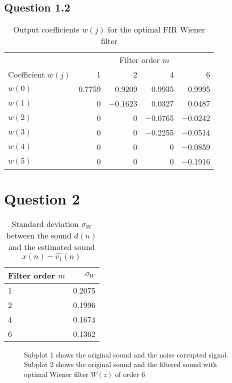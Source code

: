 \documentclass[12pt,a4paper]{article}
\begin{document}
\subsection*{Question 1.2}
\label{code1}

\begin{table}[h!]
\centering
\caption{Output coefficients $w(j)$ for the optimal FIR Wiener filter}
\begin{tabular}{l r r r r}
\hline
 & \multicolumn{4}{c}{Filter order $m$}\\
 \cline{2-5}
Coefficient $w(j)$ & \num{1} & \num{2} & \num{4} & \num{6} \\
\hline
$w(0)$ & \num{0.7759} & \num{0.9209}& \num{0.9935} & \num{0.9995} \\
$w(1)$ & \num{0} & \num{-0.1623}& \num{0.0327}& \num{0.0487} \\
$w(2)$ & \num{0}& \num{0}& \num{-0.0765}& \num{-0.0242}\\
$w(3)$ & \num{0}& \num{0}& \num{-0.2255}& \num{-0.0514}\\
$w(4)$ & \num{0}& \num{0}& \num{0}& \num{-0.0859}\\
$w(5)$ & \num{0}& \num{0}& \num{0}& \num{-0.1916}\\
\hline
\end{tabular}
\end{table}

\clearpage\section*{Question 2}

\begin{table}[h!]
\centering
\caption{Standard deviation $\sigma_{W}$ between the sound $d(n)$ and the estimated sound $x(n) - \hat{v_{1}}(n)$}
\begin{tabular}{l | r}
Filter order $m$ & $\sigma_{W}$ \\
\hline
\num{1} & \num{0.2075}\\
\num{2} & \num{0.1996}\\
\num{4} & \num{0.1674}\\
\num{6} & \num{0.1362}\\
\hline
\end{tabular}
\end{table}

\begin{figure}[h!]
\centering

\caption{Subplot 1 shows the original sound and the noise corrupted signal. Subplot 2 shows the original sound and the filtered sound with optimal Wiener filter $W(z)$ of order \num{6}}
\end{figure}
\end{document}
